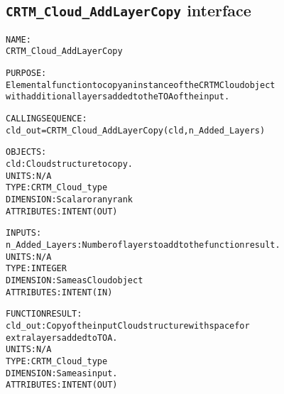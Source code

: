 \subsection{\texttt{CRTM\_Cloud\_AddLayerCopy} interface}
  \label{sec:CRTM_Cloud_AddLayerCopy_interface}
  \begin{alltt}
 
  NAME:
        CRTM_Cloud_AddLayerCopy
 
  PURPOSE:
        Elemental function to copy an instance of the CRTM Cloud object
        with additional layers added to the TOA of the input.
 
  CALLING SEQUENCE:
        cld_out = CRTM_Cloud_AddLayerCopy( cld, n_Added_Layers )
 
  OBJECTS:
        cld:             Cloud structure to copy.
                         UNITS:      N/A
                         TYPE:       CRTM_Cloud_type
                         DIMENSION:  Scalar or any rank
                         ATTRIBUTES: INTENT(OUT)
 
  INPUTS:
        n_Added_Layers:  Number of layers to add to the function result.
                         UNITS:      N/A
                         TYPE:       INTEGER
                         DIMENSION:  Same as Cloud object
                         ATTRIBUTES: INTENT(IN)
 
  FUNCTION RESULT:
        cld_out:         Copy of the input Cloud structure with space for
                         extra layers added to TOA.
                         UNITS:      N/A
                         TYPE:       CRTM_Cloud_type
                         DIMENSION:  Same as input.
                         ATTRIBUTES: INTENT(OUT)
 
 
  \end{alltt}
